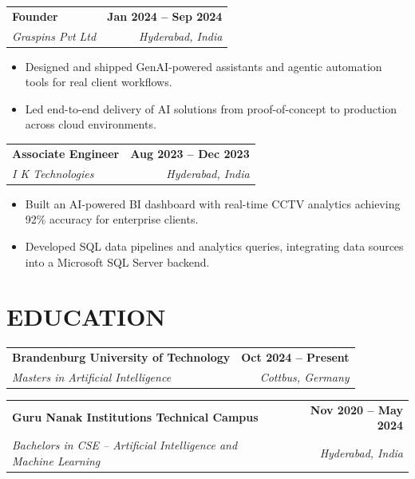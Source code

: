 \documentclass[a4paper,11pt]{article}
\makeatletter
\newcommand{\entryheader}[4]{%
  \begin{tabularx}{\textwidth}{@{}>{\RaggedRight\arraybackslash}X r@{}}
    \textbf{#1} & \textbf{#2} \\
    \textit{#3} & \textit{#4} \\
  \end{tabularx}%
}
\newenvironment{entrybullets}{%
  \begin{minipage}[t]{0.77\textwidth}
    \begin{itemize}[leftmargin=*,label=\textbullet,align=left]
}{%
    \end{itemize}
  \end{minipage}
}
\makeatother
\begin{document}
\vspace{0.25cm}
\entryheader{Founder}{Jan 2024 -- Sep 2024}{Graspins Pvt Ltd}{Hyderabad, India}
\begin{entrybullets}
  \item Designed and shipped GenAI-powered assistants and agentic automation tools for real client workflows.
  \item Led end-to-end delivery of AI solutions from proof-of-concept to production across cloud environments.
\end{entrybullets}

\vspace{0.25cm}
\entryheader{Associate Engineer}{Aug 2023 -- Dec 2023}{I K Technologies}{Hyderabad, India}
\begin{entrybullets}
  \item Built an AI-powered BI dashboard with real-time CCTV analytics achieving 92\% accuracy for enterprise clients.
  \item Developed SQL data pipelines and analytics queries, integrating data sources into a Microsoft SQL Server backend.
\end{entrybullets}

\section*{EDUCATION}
\begin{tabularx}{\textwidth}{@{}X r@{}}
  \textbf{Brandenburg University of Technology} & \textbf{Oct 2024 -- Present} \\
  \textit{Masters in Artificial Intelligence} & \textit{Cottbus, Germany} \\
\end{tabularx}

\vspace{0.25cm}
\begin{tabularx}{\textwidth}{@{}X r@{}}
  \textbf{Guru Nanak Institutions Technical Campus} & \textbf{Nov 2020 -- May 2024} \\
  \textit{Bachelors in CSE -- Artificial Intelligence and Machine Learning} & \textit{Hyderabad, India} \\
\end{tabularx}

\end{document}
